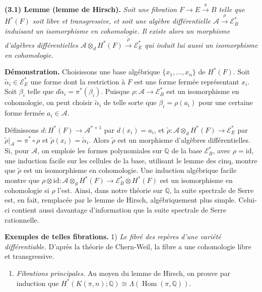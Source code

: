 \documentclass[
  french,
  a3paper,
  a3paper]{extarticle}
\providecommand{\tightlist}{%
  \setlength{\itemsep}{0pt}\setlength{\parskip}{0pt}}
\begin{document}
\textbf{(3.1) Lemme (lemme de Hirsch).} \emph{Soit une fibration
\(F\longrightarrow E\xrightarrow{\pi}B\) telle que \(H^*(F)\) soit libre
et transgressive, et soit une algèbre différentielle
\(\mathcal A\xrightarrow{\rho}\mathcal E_B^*\) induisant un isomorphisme
en cohomologie. Il existe alors un morphisme d'algèbres différentielles
\(\mathcal A\otimes_d H^*(F)\xrightarrow{\widetilde\rho}\mathcal E_E^*\)
qui induit lui aussi un isomorphisme en cohomologie.}

\textbf{Démonstration.} Choisissons une base algébrique
\(\{x_1,\ldots,x_n\}\) de \(H^*(F)\). Soit
\(\widetilde\alpha_i\in\mathcal E_E^*\) une forme dont la restriction à
\(F\) est une forme fermée représentant \(x_i\). Soit \(\beta_i\) telle
que \(d\widetilde\alpha_i=\pi^*(\beta_i)\). Puisque
\(\rho:\mathcal A\longrightarrow\mathcal E_B^*\) est un isomorphisme en
cohomologie, on peut choisir \(\widetilde\alpha_i\) de telle sorte que
\(\beta_i=\rho(a_i)\) pour une certaine forme fermée
\(a_i\in\mathcal A\).

Définissons \(d:H^*(F)\longrightarrow\mathcal A^{*+1}\) par
\(d(x_i)=a_i\), et
\(\widetilde\rho:\mathcal A\otimes_d H^*(F)\longrightarrow\mathcal E_E^*\)
par \(\widetilde\rho|_{\mathcal A}=\pi^*\circ\rho\) et
\(\widetilde\rho(x_i)=\widetilde\alpha_i\). Alors \(\widetilde\rho\) est
un morphisme d'algèbres différentielles. Si, pour \(\mathcal A\), on
emploie les formes polynomiales sur \(\mathbb Q\) de la base
\(\mathcal E_B^*\), avec \(\rho=\mathrm{id}\), une induction facile sur
les cellules de la base, utilisant le lemme des cinq, montre que
\(\widetilde\rho\) est un isomorphisme en cohomologie. Une induction
algébrique facile montre que
\(\rho\otimes\mathrm{id}:\mathcal A\otimes_d H^*(F)\longrightarrow\mathcal E_B^*\otimes H^*(F)\)
est un isomorphisme en cohomologie si \(\rho\) l'est. Ainsi, dans notre
théorie sur \(\mathbb Q\), la suite spectrale de Serre est, en fait,
remplacée par le lemme de Hirsch, algébriquement plus simple. Celui-ci
contient aussi davantage d'information que la suite spectrale de Serre
rationnelle.

\textbf{Exemples de telles fibrations.} 1) \emph{Le fibré des repères
d'une variété différentiable.} D'après la théorie de Chern-Weil, la
fibre a une cohomologie libre et transgressive.

\begin{enumerate}
\def\labelenumi{\arabic{enumi})}
\setcounter{enumi}{1}
\tightlist
\item
  \emph{Fibrations principales.} Au moyen du lemme de Hirsch, on prouve
  par induction que
  \(H^*(K(\pi,n);\mathbb Q)\cong\Lambda(\operatorname{Hom}(\pi,\mathbb Q))\).
\end{enumerate}
\end{document}
